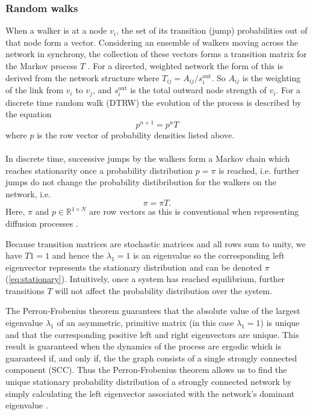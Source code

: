 \documentclass[12pt,a4paper]{article}
\begin{document}
\subsubsection{Random walks} \label{section:random walks}
\noindent When a walker is at a node $v_i$, the set of its transition (jump) probabilities out of that node form a vector. Considering an ensemble of walkers moving across the network in synchrony, the collection of these vectors forms a transition matrix for the Markov process $T$ \cite{lambiottenotes}. For a directed, weighted network the form of this is derived from the network structure where $T_{ij} = A_{ij}/s_i^{\text{out}}$. So $A_{ij}$ is the weighting of the link from $v_i$ to $v_j$, and $s_i^{\text{out}}$ is the total outward node strength of $v_i$. For a discrete time random walk (DTRW) the evolution of the process is described by the equation \begin{equation}p^{n+1} = p^n T\end{equation} where $p$ is the row vector of probability densities listed above. \\ \\

\noindent In discrete time, successive jumps by the walkers form a Markov chain which reaches stationarity once a probability distribution $p=\pi$ is reached, i.e. further jumps do not change the probability distibribution for the walkers on the network, i.e.
\begin{equation}\label{eq:stationary}
  \pi = \pi T.
\end{equation}
Here, $\pi$ and $p \in \mathbb{R}^{1\times N}$ are row vectors as this is conventional when representing diffusion processes \cite{schaub2019multiscale}. \medskip

\noindent Because transition matrices are stochastic matrices and all rows sum to unity, we have $T1=1$ and hence the $\lambda_1=1$ is an eigenvalue so the corresponding left eigenvector represents the stationary distribution and can be denoted $\pi$ (\ref{eq:stationary}). Intuitively, once a system has reached equilibrium, further transitions $T$ will not affect the probability distribution over the system. \medskip

\noindent The Perron-Frobenius theorem guarantees that the absolute value of the largest eigenvalue $\lambda_1$ of an asymmetric, primitive matrix (in this case $\lambda_1 = 1$) is unique and that the corresponding positive left and right eigenvectors are unique. This result is guaranteed when the dynamics of the process are ergodic which is guaranteed if, and only if, the the graph consists of a single strongly connected component (SCC). Thus the Perron-Frobenius theorem allows us to find the unique stationary probability distribution of a strongly connected network by simply calculating the left eigenvector associated with the network's dominant eigenvalue \cite{salnikov2016}.
\end{document}
